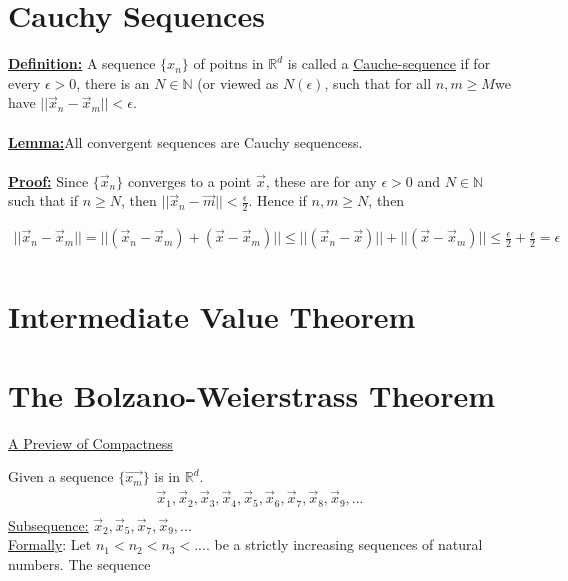 \documentclass[12pt,letterpaper]{article}
\begin{document}
\section*{Cauchy Sequences}
\uline{\textbf{Definition:}} A sequence $\{x_n\}$ of poitns in $\mathbb{R}^d$ is called a \uline{Cauche-sequence} if for every $\epsilon>0$, there is an $N\in\mathbb{N}$ (or viewed as $N(\epsilon)$, such that for all $n,m\ge M$we have  $||\vec{x}_n-\vec{x}_m||<\epsilon$.\\
\\
\uline{\textbf{Lemma:}}All convergent sequences are Cauchy sequencess. \\
\\
\uline{\textbf{Proof:}} Since $\{\vec{x}_n\}$ converges to a point $\vec{x}$, these are for any $\epsilon >0$ and $N\in\mathbb{N}$ such that if $n\ge N$, then $||\vec{x}_n-\vec{m}||<\frac{\epsilon}{2}$. Hence if  $n,m \ge N$, then 

\begin{align*}
	||\vec{x}_n-\vec{x}_m|| = ||(\vec{x}_n- \vec{x}_m) + ( \vec{x}- \vec{x}_m)|| \le ||(\vec{x}_n- \vec{x})|| + ||( \vec{x}- \vec{x}_m)|| \le \frac{\epsilon}{2}+\frac{\epsilon}{2} = \epsilon \\
\end{align*}

\section*{Intermediate Value Theorem}






\section*{The Bolzano-Weierstrass Theorem}
\uline{A Preview of Compactness}

Given a sequence $\{\vec{x_m}\}$ is in $\mathbb{R}^d$.
\begin{align*}
	\vec{x}_1, \vec{x}_2, \vec{x}_3, \vec{x}_4, \vec{x}_5, \vec{x}_6, \vec{x}_7, \vec{x}_8, \vec{x}_9, ... \\
\end{align*}
\uline{Subsequence:} $ \vec{x}_2, \vec{x}_5, \vec{x}_7, \vec{x}_9, ...$ \\

\uline{Formally}: Let $n_1<n_2<n_3<....$ be a strictly increasing sequences of natural numbers. The sequence
\end{document}
